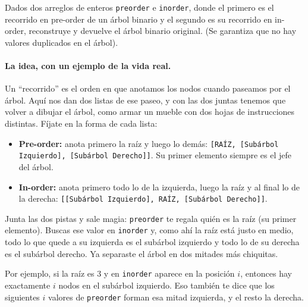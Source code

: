 
Dados dos arreglos de enteros \texttt{preorder} e \texttt{inorder}, donde el primero
es el recorrido en pre-order de un árbol binario y el segundo es su recorrido en
in-order, reconstruye y devuelve el árbol binario original. (Se garantiza que no
hay valores duplicados en el árbol).

\paragraph{La idea, con un ejemplo de la vida real.} Un ``recorrido'' es el
orden en que anotamos los nodos cuando paseamos por el árbol. Aquí nos dan dos
listas de ese paseo, y con las dos juntas tenemos que volver a dibujar el árbol,
como armar un mueble con dos hojas de instrucciones distintas. Fíjate en la
forma de cada lista:
\begin{itemize}
    \item \textbf{Pre-order:} anota primero la raíz y luego lo demás: \texttt{[RAÍZ, [Subárbol Izquierdo], [Subárbol Derecho]]}. Su primer elemento siempre es el jefe del árbol.
    \item \textbf{In-order:} anota primero todo lo de la izquierda, luego la raíz y al final lo de la derecha: \texttt{[[Subárbol Izquierdo], RAÍZ, [Subárbol Derecho]]}.
\end{itemize}

Junta las dos pistas y sale magia: \texttt{preorder} te regala quién es la raíz
(su primer elemento). Buscas ese valor en \texttt{inorder} y, como ahí la raíz
está justo en medio, todo lo que quede a su izquierda es el subárbol izquierdo y
todo lo de su derecha es el subárbol derecho. Ya separaste el árbol en dos
mitades más chiquitas.

Por ejemplo, si la raíz es 3 y en \texttt{inorder} aparece en la posición $i$,
entonces hay exactamente $i$ nodos en el subárbol izquierdo. Eso también te dice
que los siguientes $i$ valores de \texttt{preorder} forman esa mitad izquierda, y
el resto la derecha.

